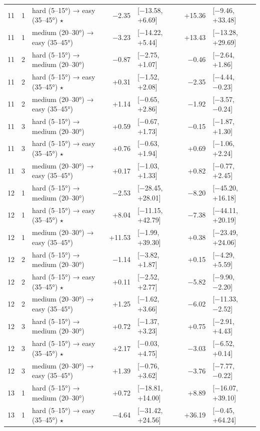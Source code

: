 \begin{table}[htbp]
\begin{tabular}{rllrlrl}
    11 & 1 & hard (5–15°) → easy (35–45°) $\star$ & −2.35 & [−13.58, +6.69] & +15.36 & [−9.46, +33.48] \\
    11 & 1 & medium (20–30°) → easy (35–45°) & −3.23 & [−14.22, +5.44] & +13.43 & [−13.28, +29.69] \\
    11 & 2 & hard (5–15°) → medium (20–30°) & −0.87 & [−2.75, +1.07] & −0.46 & [−2.64, +1.86] \\
    11 & 2 & hard (5–15°) → easy (35–45°) $\star$ & +0.31 & [−1.52, +2.08] & −2.35 & [−4.44, −0.23] \\
    11 & 2 & medium (20–30°) → easy (35–45°) & +1.14 & [−0.65, +2.86] & −1.92 & [−3.57, −0.24] \\
    11 & 3 & hard (5–15°) → medium (20–30°) & +0.59 & [−0.67, +1.73] & −0.15 & [−1.87, +1.30] \\
    11 & 3 & hard (5–15°) → easy (35–45°) $\star$ & +0.76 & [−0.63, +1.94] & +0.69 & [−1.06, +2.24] \\
    11 & 3 & medium (20–30°) → easy (35–45°) & +0.17 & [−1.03, +1.33] & +0.82 & [−0.77, +2.45] \\
    12 & 1 & hard (5–15°) → medium (20–30°) & −2.53 & [−28.45, +28.01] & −8.20 & [−45.20, +16.18] \\
    12 & 1 & hard (5–15°) → easy (35–45°) $\star$ & +8.04 & [−11.15, +42.79] & −7.38 & [−44.11, +20.19] \\
    12 & 1 & medium (20–30°) → easy (35–45°) & +11.53 & [−1.99, +39.30] & +0.38 & [−23.49, +24.06] \\
    12 & 2 & hard (5–15°) → medium (20–30°) & −1.14 & [−3.82, +1.87] & +0.15 & [−4.29, +5.59] \\
    12 & 2 & hard (5–15°) → easy (35–45°) $\star$ & +0.11 & [−2.52, +2.77] & −5.82 & [−9.90, −2.20] \\
    12 & 2 & medium (20–30°) → easy (35–45°) & +1.25 & [−1.62, +3.66] & −6.02 & [−11.33, −2.52] \\
    12 & 3 & hard (5–15°) → medium (20–30°) & +0.72 & [−1.37, +3.23] & +0.75 & [−2.91, +4.43] \\
    12 & 3 & hard (5–15°) → easy (35–45°) $\star$ & +2.17 & [−0.03, +4.75] & −3.03 & [−6.52, +0.14] \\
    12 & 3 & medium (20–30°) → easy (35–45°) & +1.39 & [−0.76, +3.62] & −3.76 & [−7.77, −0.22] \\
    13 & 1 & hard (5–15°) → medium (20–30°) & +0.72 & [−18.81, +14.00] & +8.89 & [−16.07, +39.10] \\
    13 & 1 & hard (5–15°) → easy (35–45°) $\star$ & −4.64 & [−31.42, +24.56] & +36.19 & [−0.45, +64.24] \\

\end{tabular}
\end{table}

